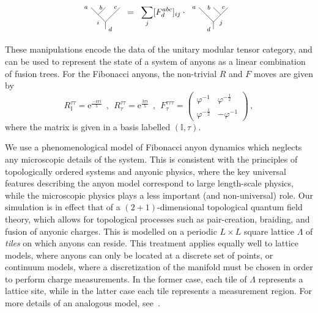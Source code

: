 \documentclass[aps, prl, letterpaper, twocolumn, superscriptaddress, notitlepage, 10pt]{revtex4-1}
\newcommand{\e}{\mathrm{e}}
\begin{document}
	\begin{align}
		\label{e:fmove}
		\begin{tikzpicture}[baseline=0.6cm,scale=0.3]
			\draw(0,0)--(0,1)--(-2,3);
			\draw(0,3)--(-1,2);
			\draw(2,3)--(0,1);
			\node at (-0.45,1.6) [anchor=north east] {{\scriptsize $i$}};
			\node at (0,0) [anchor=west] {{\scriptsize $d$}};
			\node at (2,3) [anchor=east] {{\scriptsize $c$}};
			\node at (0,3) [anchor=east] {{\scriptsize $b$}};
			\node at (-2,3) [anchor=east] {{\scriptsize $a$}};
		\end{tikzpicture}
		&\;\;=\;\;\sum_j[F^{abc}_d]_{ij}\cdot\;
		\begin{tikzpicture}[baseline=0.6cm,scale=0.3]		
			\draw(0,0)--(0,1)--(-2,3);
			\draw(0,3)--(1,2);
			\draw(2,3)--(0,1);
			\node at (0.42,1.63) [anchor=north west] {{\scriptsize $j$}};
			\node at (0,0) [anchor=east] {{\scriptsize $d$}};
			\node at (2,3) [anchor=east] {{\scriptsize $c$}};
			\node at (0,3) [anchor=east] {{\scriptsize $b$}};
			\node at (-2,3) [anchor=east] {{\scriptsize $a$}};
		\end{tikzpicture}
	\end{align}

These manipulations encode the data of the unitary modular tensor category, and can be used to represent the state of a system of anyons as a linear combination of fusion trees. For the Fibonacci anyons, the non-trivial $R$ and $F$ moves are given by
\begin{equation*}
	R_{\mathbb{I}}^{\tau\tau} = \e^{\frac{-4\pi i}{5}} 
	\ \ , \ \
	R_\tau^{\tau\tau}= \e^{\frac{3\pi i}{5}} 
	\ \ , \ \
	F_{\tau}^{\tau\tau\tau} = \begin{pmatrix}\varphi^{-1}&\varphi^{-\frac{1}{2}}\\\varphi^{-\frac{1}{2}}&-\varphi^{-1}\end{pmatrix} \,,
\end{equation*}
where the matrix is given in a basis labelled $(\mathbb{I},\tau)$.

We use a phenomenological model of Fibonacci anyon dynamics which neglects any 
microscopic details of the system. 
This is consistent with the principles of topologically 
ordered systems and anyonic physics, where the key universal features describing the 
anyon model correspond to large length-scale physics, while the microscopic physics plays 
a less important (and non-universal) role.
Our simulation is in effect that of a $(2+1)$-dimensional topological quantum field theory, which allows for topological processes such as pair-creation, braiding, and fusion of anyonic charges. This is modelled on a periodic $L\times L$ square lattice $\Lambda$ of \emph{tiles} on which anyons can reside.  This treatment applies equally well to lattice models, where anyons can only be located at a discrete set of points, or continuum models, where a discretization of the manifold must be chosen in order to perform charge measurements. In the former case, each tile of $\Lambda$ represents a lattice site, while in the latter case each tile represents a measurement region. For more details of an analogous model, see~\cite{Brell2013}.
\end{document}
